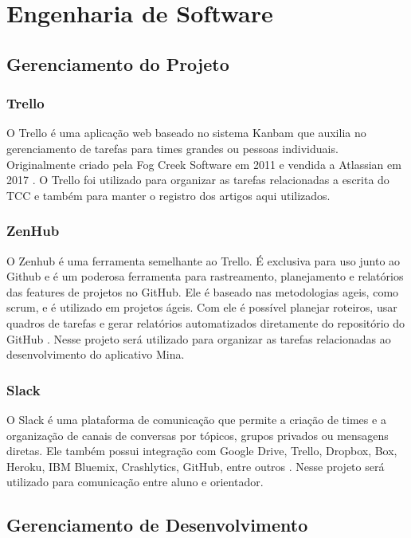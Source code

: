 \section{Engenharia de Software}

\subsection{Gerenciamento do Projeto}

\subsubsection{Trello}

O Trello é uma aplicação web baseado no sistema Kanbam que auxilia no gerenciamento de tarefas para times grandes ou pessoas individuais. Originalmente criado pela Fog Creek Software em 2011 e vendida a Atlassian em 2017 \cite{trello2011}. O Trello foi utilizado para organizar as tarefas relacionadas a escrita do TCC e também para manter o registro dos artigos aqui utilizados.

\subsubsection{ZenHub}

O Zenhub é uma ferramenta semelhante ao Trello. É exclusiva para uso junto ao Github e é um poderosa ferramenta para rastreamento, planejamento e relatórios das features de projetos no GitHub. Ele é baseado nas metodologias ageis, como scrum, e é utilizado em projetos ágeis. Com ele é possível planejar roteiros, usar quadros de tarefas e gerar relatórios automatizados diretamente do repositório do GitHub \cite{zenhub2020}. Nesse projeto será utilizado para organizar as tarefas relacionadas ao desenvolvimento do aplicativo Mina.


\subsubsection{Slack}

O Slack é uma plataforma de comunicação que permite a criação de times e a organização de canais de conversas por tópicos, grupos privados ou mensagens diretas. Ele também possui integração com  Google Drive, Trello, Dropbox, Box, Heroku, IBM Bluemix, Crashlytics, GitHub, entre outros \cite{slack2013}. Nesse projeto será utilizado para comunicação entre aluno e orientador.

\subsection{Gerenciamento de Desenvolvimento}

